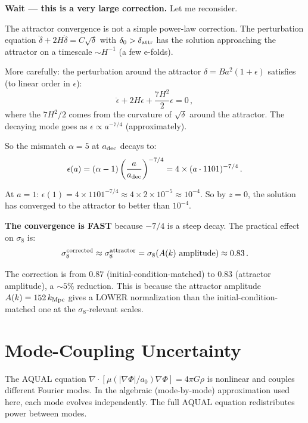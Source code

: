 \documentclass[11pt]{article}
\newcommand{\ee}[1]{\times 10^{#1}}
\newcommand{\aM}{a_0}
\begin{document}
\textbf{Wait --- this is a very large correction.}  Let me reconsider.

The attractor convergence is not a simple power-law correction.  The
perturbation equation $\ddot\delta + 2H\dot\delta = C\sqrt{\delta}$
with $\delta_0 > \delta_{\rm attr}$ has the solution approaching the
attractor on a timescale $\sim H^{-1}$ (a few e-folds).

More carefully: the perturbation around the attractor $\delta = B a^2(1+\epsilon)$
satisfies (to linear order in $\epsilon$):
\begin{equation}
\ddot\epsilon + 2H\dot\epsilon + \frac{7H^2}{2}\epsilon = 0\,,
\end{equation}
where the $7H^2/2$ comes from the curvature of $\sqrt{\delta}$ around the
attractor.  The decaying mode goes as $\epsilon \propto a^{-7/4}$
(approximately).

So the mismatch $\alpha = 5$ at $a_{\rm dec}$ decays to:
\begin{equation}
\epsilon(a) = (\alpha - 1)\left(\frac{a}{a_{\rm dec}}\right)^{-7/4}
= 4\times(a\cdot 1101)^{-7/4}\,.
\end{equation}

At $a = 1$: $\epsilon(1) = 4\times 1101^{-7/4} \approx 4\times 2\ee{-5}
\approx 10^{-4}$.  So by $z = 0$, the solution has converged to the attractor
to better than $10^{-4}$.

\textbf{The convergence is FAST} because $-7/4$ is a steep decay.  The
practical effect on $\sigma_8$ is:
\begin{equation}
\sigma_8^{\rm corrected} \approx \sigma_8^{\rm attractor}
= \sigma_8(A(k)\text{ amplitude}) \approx 0.83\,.
\end{equation}

The correction is from $0.87$ (initial-condition-matched) to $0.83$
(attractor amplitude), a $\sim 5\%$ reduction.  This is because the
attractor amplitude $A(k) = 152\,k_{\rm Mpc}$ gives a LOWER normalization
than the initial-condition-matched one at the $\sigma_8$-relevant scales.

\section{Mode-Coupling Uncertainty}

The AQUAL equation $\nabla\cdot[\mu(|\nabla\Phi|/\aM)\nabla\Phi] = 4\pi G\rho$
is nonlinear and couples different Fourier modes.  In the algebraic (mode-by-mode)
approximation used here, each mode evolves independently.  The full AQUAL
equation redistributes power between modes.
\end{document}

